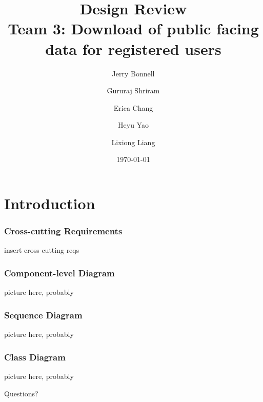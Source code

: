\documentclass{beamer}
\title{
\textbf{Design Review} \\ \small{Team 3: Download of public facing data for registered users}
}
\author{
Jerry Bonnell
\and Gururaj Shriram
\and Erica Chang 
\and Heyu Yao
\and Lixiong Liang
} %
\date{\today} %
\begin{document}
\begin{frame}[plain]
	\titlepage
\end{frame}


\section{Introduction}
\begin{frame}
	\frametitle{Cross-cutting Requirements}
		insert cross-cutting reqs
\end{frame}
\begin{frame}
	\frametitle{Component-level Diagram}
	\begin{center}
		picture here, probably 
	\end{center}
\end{frame}
\begin{frame}
	\frametitle{Sequence Diagram}
	\begin{center}
		picture here, probably 
	\end{center}
\end{frame}
\begin{frame}
	\frametitle{Class Diagram}
	\begin{center}
		picture here, probably 
	\end{center}
\end{frame}
\begin{frame}
	\Huge{\centerline{Questions?}}
\end{frame}
\end{document}
